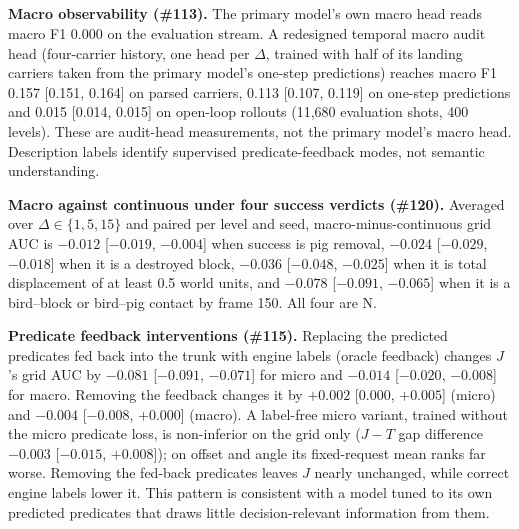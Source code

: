 \subsection{\texorpdfstring{}{Predicate feedback and the macro audit}}
\label{sec:app:res:macro}

\begin{revblock}
\nopagebreak
\textbf{Macro observability (\#113).} The primary model's own macro head reads macro F1 0.000 on the evaluation stream. A redesigned temporal macro audit head (four-carrier history, one head per $\Delta$, trained with half of its landing carriers taken from the primary model's one-step predictions) reaches macro F1 0.157 [0.151, 0.164] on parsed carriers, 0.113 [0.107, 0.119] on one-step predictions and 0.015 [0.014, 0.015] on open-loop rollouts (11,680 evaluation shots, 400 levels). These are audit-head measurements, not the primary model's macro head. Description labels identify supervised predicate-feedback modes, not semantic understanding.

\textbf{Macro against continuous under four success verdicts (\#120).} Averaged over $\Delta\in\{1,5,15\}$ and paired per level and seed, macro-minus-continuous grid AUC is $-0.012$ [$-0.019$, $-0.004$] when success is pig removal, $-0.024$ [$-0.029$, $-0.018$] when it is a destroyed block, $-0.036$ [$-0.048$, $-0.025$] when it is total displacement of at least 0.5 world units, and $-0.078$ [$-0.091$, $-0.065$] when it is a bird--block or bird--pig contact by frame 150. All four are N.

\textbf{Predicate feedback interventions (\#115).} Replacing the predicted predicates fed back into the trunk with engine labels (oracle feedback) changes $J$'s grid AUC by $-0.081$ [$-0.091$, $-0.071$] for micro and $-0.014$ [$-0.020$, $-0.008$] for macro. Removing the feedback changes it by $+0.002$ [$0.000$, $+0.005$] (micro) and $-0.004$ [$-0.008$, $+0.000$] (macro). A label-free micro variant, trained without the micro predicate loss, is non-inferior on the grid only ($J-T$ gap difference $-0.003$ [$-0.015$, $+0.008$]); on offset and angle its fixed-request mean ranks far worse. Removing the fed-back predicates leaves $J$ nearly unchanged, while correct engine labels lower it. This pattern is consistent with a model tuned to its own predicted predicates that draws little decision-relevant information from them.
\end{revblock}

\subsection{\texorpdfstring{}{Request-set scaling and DP labelling cost}}
\label{sec:app:res:scaling}

